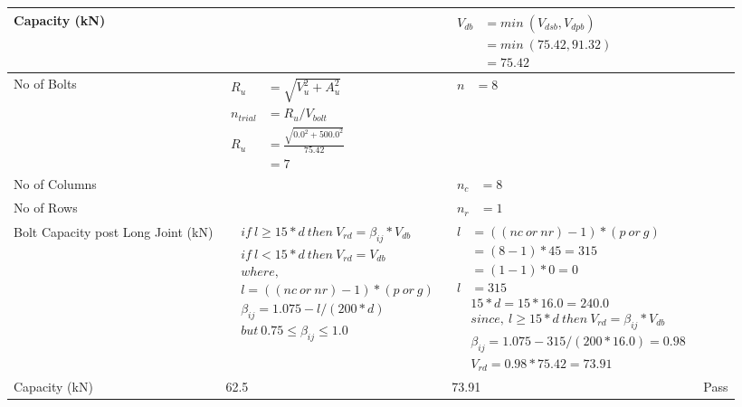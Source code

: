 \documentclass{article}%
\begin{document}
\begin{longtable}{|p{2.5cm}|p{5.5cm}|p{7cm}|p{1cm}|}
\hline%
Capacity (kN)&&$\begin{aligned}V_{db} &= min~ (V_{dsb}, V_{dpb})\\ &= min~ (75.42,91.32)\\ &=75.42\end{aligned}$&\\%
\hline%
No of Bolts&$\begin{aligned}R_{u} &= \sqrt{V_u^2+A_u^2}\\ n_{trial} &= R_u/ V_{bolt}\\ R_{u} &= \frac{\sqrt{0.0^2+500.0^2}}{75.42}\\ &=7\end{aligned}$&$\begin{aligned} n &=8\end{aligned}$&\\%
\hline%
No of Columns&&$\begin{aligned} n_c &=8\end{aligned}$&\\%
\hline%
No of Rows&&$\begin{aligned} n_r &=1\end{aligned}$&\\%
\hline%
Bolt Capacity post Long Joint (kN)&$\begin{aligned} &if~l\geq 15 * d~then~V_{rd} = \beta_{ij} * V_{db} \\ & if~l < 15 * d~then~V_{rd} = V_{db} \\ & where,\\ & l = ((nc~or~nr) - 1) * (p~or~g) \\ & \beta_{ij} = 1.075 - l/(200 * d) \\ & but~0.75\leq\beta_{ij}\leq1.0 \end{aligned}$&$\begin{aligned} l&= ((nc~or~nr) - 1) * (p~or~g) \\  &= (8 - 1) * 45=315\\  &= (1 - 1) * 0=0\\  l&= 315\\ & 15 * d = 15 * 16.0 = 240.0 \\ & since,~l \geq 15 * d~then~V_{rd} = \beta_{ij} * V_{db} \\ & \beta_{ij} = 1.075 - 315/(200*16.0) =0.98\\ & V_{rd} = 0.98 * 75.42=73.91 \end{aligned}$&\\%
\hline%
Capacity (kN)&62.5&73.91&Pass\\%
\hline%
\end{longtable}
\end{document}
